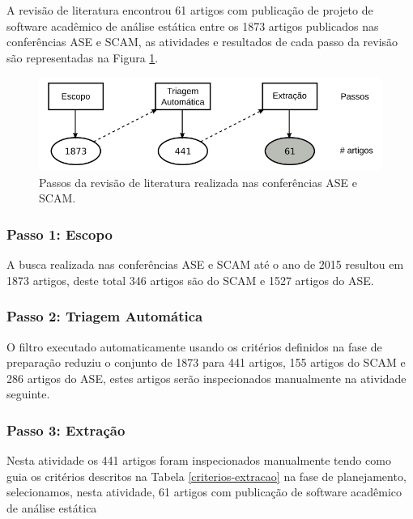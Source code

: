 A revisão de literatura encontrou 61 artigos com publicação de projeto de
software acadêmico de análise estática entre os 1873 artigos publicados nas
conferências ASE e SCAM, as atividades e resultados de cada passo da revisão
são representadas na Figura \ref{revisao-literatura}.

\begin{figure}[h]
  \center
  \includegraphics[scale=0.4]{imagens/revisao-literatura.png}
  \caption{Passos da revisão de literatura realizada nas conferências ASE e SCAM.}
  \label{revisao-literatura}
\end{figure}

\subsubsection{Passo 1: Escopo}

A busca realizada nas conferências ASE e SCAM até o ano de 2015 resultou em
1873 artigos, deste total 346 artigos são do SCAM e 1527 artigos do ASE.


\subsubsection{Passo 2: Triagem Automática}

O filtro executado automaticamente usando os critérios definidos na fase de
preparação reduziu o conjunto de 1873 para 441 artigos, 155 artigos do SCAM e
286 artigos do ASE, estes artigos serão inspecionados manualmente na atividade
seguinte.

\subsubsection{Passo 3: Extração}

Nesta atividade os 441 artigos foram inspecionados manualmente tendo como guia
os critérios descritos na Tabela \ref{criterios-extracao} na fase de
planejamento, selecionamos, nesta atividade, 61 artigos com publicação de
software acadêmico de análise estática


